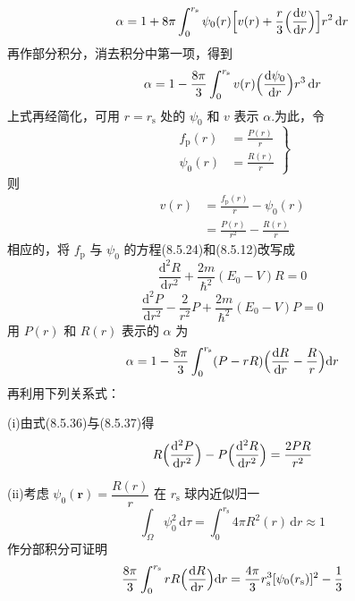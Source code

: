\begin{equation}
  \alpha=1+8\pi\int_{0}^{r_{\mathrm{s}}}\psi_{0}(r)\Bigl[v(r)+\frac{r}{3}\Bigl(\frac{\mathrm{d}v}{\mathrm{d}r}\Bigr)\Bigr]r^{2}\,\mathrm{d}r
\end{equation}
再作部分积分，消去积分中第一项，得到
\begin{equation}
  \alpha=1-\frac{8\pi}{3}\int_{0}^{r_{\mathrm{s}}}v(r)\Bigl(\frac{\mathrm{d}\psi_{0}}{\mathrm{d}r}\Bigr)r^{3}\,\mathrm{d}r
\end{equation}
上式再经简化，可用 $r=r_{\mathrm{s}}$ 处的 $\psi_{0}$ 和 $v$ 表示 $\alpha$.为此，令
\begin{equation}
  \left.
  \begin{aligned}
    f_{\mathrm{p}}(r)&=\frac{P(r)}{r}\\
    \psi_{0}(r)&=\frac{R(r)}{r}
  \end{aligned}\right\}
\end{equation}
则
\begin{equation}
\begin{aligned}
  v(r)&=\frac{f_{\mathrm{p}}(r)}{r}-\psi_{0}(r)\\
  &=\frac{P(r)}{r^{2}}-\frac{R(r)}{r}
\end{aligned}
\end{equation}
相应的，将 $f_{\mathrm{p}}$ 与 $\psi_{0}$ 的方程(8.5.24)和(8.5.12)改写成
\begin{equation}
  \frac{\mathrm{d}^{2}R}{\mathrm{d}r^{2}}+\frac{2m}{\hbar^{2}}(E_{0}-V)R=0
\end{equation}
\begin{equation}
  \frac{\mathrm{d}^{2}P}{\mathrm{d}r^{2}}-\frac{2}{r^{2}}P+\frac{2m}{\hbar^{2}}(E_{0}-V)P=0
\end{equation}
用 $P(r)$ 和 $R(r)$ 表示的 $\alpha$ 为
\begin{equation}
  \alpha=1-\frac{8\pi}{3}\int_{0}^{r_{\mathrm{s}}}(P-rR)\Bigl(\frac{\mathrm{d}R}{\mathrm{d}r}-\frac{R}{r}\Bigr)\mathrm{d}r
\end{equation}
再利用下列关系式：

(i)由式(8.5.36)与(8.5.37)得
\begin{equation}
  R\Bigl(\frac{\mathrm{d}^{2}P}{\mathrm{d}r^{2}}\Bigr)-P\Bigl(\frac{\mathrm{d}^{2}R}{\mathrm{d}r^{2}}\Bigr)=\frac{2PR}{r^{2}}
\end{equation}

(ii)考虑 $\psi_{0}(\boldsymbol{r})=\dfrac{R(r)}{r}$ 在 $r_{\mathrm{s}}$ 球内近似归一
\begin{equation}
  \int_{\Omega}\psi_{0}^{2}\,\mathrm{d}\tau=\int_{0}^{r_{\mathrm{s}}}4\pi R^{2}(r)\,\mathrm{d}r\approx 1
\end{equation}
作分部积分可证明
\begin{equation}
  \frac{8\pi}{3}\int_{0}^{r_{\mathrm{s}}}rR\Bigl(\frac{\mathrm{d}R}{\mathrm{d}r}\Bigr)\mathrm{d}r
  =\frac{4\pi}{3}r_{\mathrm{s}}^{3}[\psi_{0}(r_{\mathrm{s}})]^{2}-\frac{1}{3}
\end{equation}

